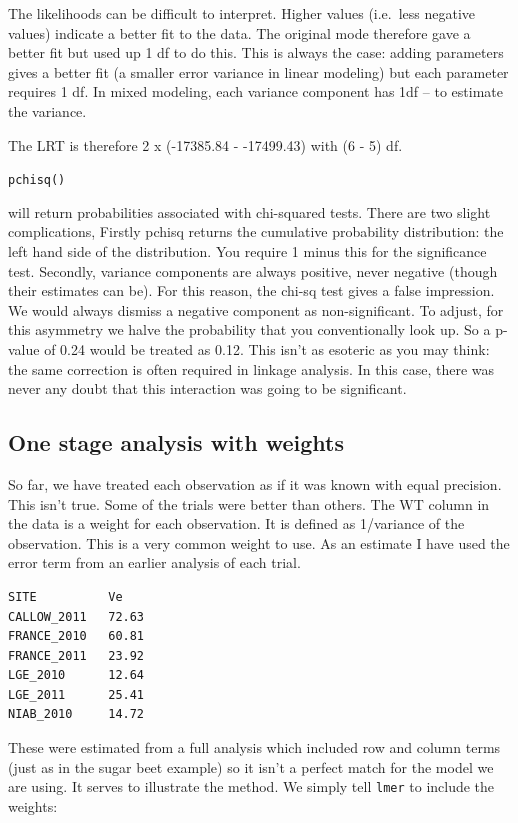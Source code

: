 \documentclass[
]{book}
\begin{document}
The likelihoods can be difficult to interpret. Higher values (i.e.~less negative values) indicate a better fit to the data. The original mode therefore gave a better fit but used up 1 df to do this. This is always the case: adding parameters gives a better fit (a smaller error variance in linear modeling) but each parameter requires 1 df. In mixed modeling, each variance component has 1df -- to estimate the variance.

The LRT is therefore 2 x (-17385.84 - -17499.43) with (6 - 5) df.

\texttt{pchisq()}

will return probabilities associated with chi-squared tests. There are two slight complications, Firstly pchisq returns the cumulative probability distribution: the left hand side of the distribution. You require 1 minus this for the significance test. Secondly, variance components are always positive, never negative (though their estimates can be). For this reason, the chi-sq test gives a false impression. We would always dismiss a negative component as non-significant. To adjust, for this asymmetry we halve the probability that you conventionally look up. So a p-value of 0.24 would be treated as 0.12. This isn't as esoteric as you may think: the same correction is often required in linkage analysis. In this case, there was never any doubt that this interaction was going to be significant.

\hypertarget{one-stage-analysis-with-weights}{%
\subsection{One stage analysis with weights}\label{one-stage-analysis-with-weights}}

So far, we have treated each observation as if it was known with equal precision. This isn't true. Some of the trials were better than others. The WT column in the data is a weight for each observation. It is defined as 1/variance of the observation. This is a very common weight to use. As an estimate I have used the error term from an earlier analysis of each trial.

\begin{verbatim}
SITE          Ve
CALLOW_2011   72.63
FRANCE_2010   60.81
FRANCE_2011   23.92
LGE_2010      12.64
LGE_2011      25.41
NIAB_2010     14.72
\end{verbatim}

These were estimated from a full analysis which included row and column terms (just as in the sugar beet example) so it isn't a perfect match for the model we are using. It serves to illustrate the method. We simply tell \texttt{lmer} to include the weights:
\end{document}
